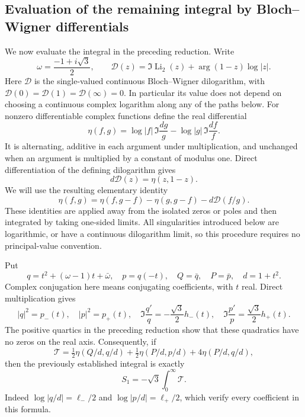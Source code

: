 \documentclass[11pt,a4paper]{article}
\theoremstyle{remark}\newtheorem{remark}[theorem]{Remark}
\numberwithin{equation}{section}
\begin{document}
\subsection{Evaluation of the remaining integral by Bloch--Wigner differentials}
\label{s419:sec:sun419-new-evaluation}
We now evaluate the integral in the preceding reduction. Write
\[
 \omega=\frac{-1+i\sqrt3}{2},\qquad
 \mathcal D(z)=\Im\operatorname{Li}_2(z)
                 +\arg(1-z)\log|z|.
\]
Here $\mathcal D$ is the single-valued continuous Bloch--Wigner
dilogarithm, with $\mathcal D(0)=\mathcal D(1)=\mathcal D(\infty)=0$.
In particular its value does not depend on choosing a continuous complex
logarithm along any of the paths below. For nonzero differentiable
complex functions define the real differential
\[
 \eta(f,g)=\log|f|\,\Im\frac{dg}{g}
              -\log|g|\,\Im\frac{df}{f}.
\]
It is alternating, additive in each argument under multiplication,
and unchanged when an argument is multiplied by a constant of modulus
one. Direct differentiation of the defining dilogarithm gives
\begin{equation}\label{s419:eq:sun419-bw-differential}
 d\mathcal D(z)=\eta(z,1-z).
\end{equation}
We will use the resulting elementary identity
\begin{equation}\label{s419:eq:sun419-eta-difference}
 \eta(f,g)=\eta(f,g-f)-\eta(g,g-f)-d\mathcal D(f/g).
\end{equation}
These identities are applied away from the isolated zeros or poles and
then integrated by taking one-sided limits. All singularities introduced
below are logarithmic, or have a continuous dilogarithm limit, so this
procedure requires no principal-value convention.

Put
\[
 q=t^2+(\omega-1)t+\bar\omega,\quad p=q(-t),\quad
 Q=\bar q,\quad P=\bar p,\quad d=1+t^2.
\]
Complex conjugation here means conjugating coefficients, with $t$ real.
Direct multiplication gives
\[
 |q|^2=p_-(t),\quad |p|^2=p_+(t),\quad
 \Im\frac{q'}q=-\frac{\sqrt3}{2}h_-(t),\quad
 \Im\frac{p'}p=\frac{\sqrt3}{2}h_+(t).
\]
The positive quartics in the preceding reduction show that these
quadratics have no zeros on the real axis. Consequently, if
\begin{equation}\label{s419:eq:sun419-Tform}
 \mathcal T=\tfrac12\eta(Q/d,q/d)+\tfrac12\eta(P/d,p/d)
                          +4\eta(P/d,q/d),
\end{equation}
then the previously established integral is exactly
\begin{equation}\label{s419:eq:sun419-S1-T}
 S_1=-\sqrt3\int_0^\infty\mathcal T.
\end{equation}
Indeed $\log|q/d|=\ell_-/2$ and
$\log|p/d|=\ell_+/2$, which verify every coefficient in this formula.
\end{document}
